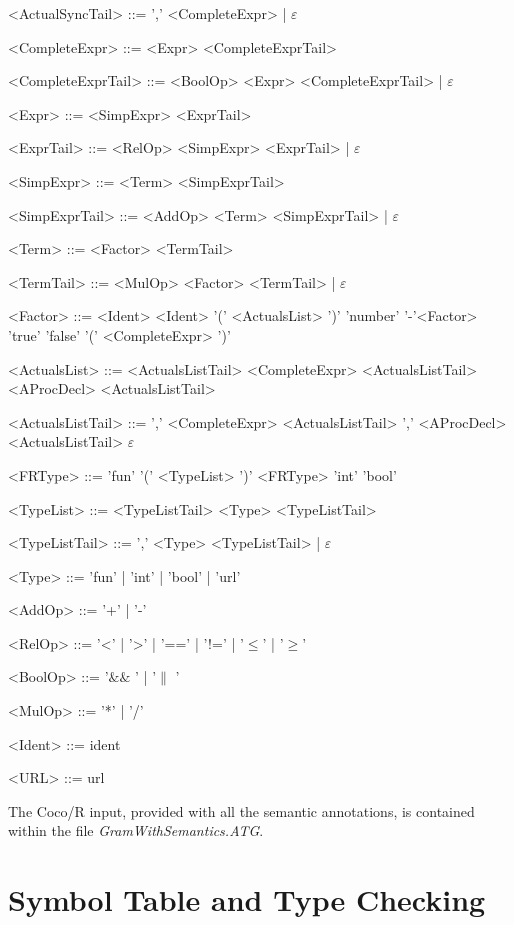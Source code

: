 \begin{grammar}
<ActualSyncTail> ::= ',' <CompleteExpr> | $\varepsilon$

<CompleteExpr> ::= <Expr> <CompleteExprTail> 

<CompleteExprTail> ::= <BoolOp> <Expr> <CompleteExprTail> | $\varepsilon$
		  
<Expr> ::= <SimpExpr> <ExprTail>

<ExprTail> ::=  <RelOp> <SimpExpr> <ExprTail> | $\varepsilon$
	  
<SimpExpr> ::= <Term> <SimpExprTail>

<SimpExprTail> ::=  <AddOp> <Term> <SimpExprTail> | $\varepsilon$

<Term> ::= <Factor> <TermTail>

<TermTail> ::= <MulOp> <Factor> <TermTail> | $\varepsilon$

<Factor> ::= 
		<Ident>
		\alt <Ident> '(' <ActualsList> ')' 
		\alt 'number' 
		\alt '-'<Factor> 	
		\alt 'true' 
		\alt 'false' 
		\alt '(' <CompleteExpr> ')'
		
<ActualsList> ::= 	<ActualsListTail> 
					 <ActualsListTail>
					\alt <AProcDecl> <ActualsListTail>

<ActualsListTail> ::= 	',' <CompleteExpr> <ActualsListTail>
						\alt ',' <AProcDecl> <ActualsListTail>
						\alt $\varepsilon$					
		
<FRType> ::= 'fun' '(' <TypeList> ')' <FRType>
			\alt 'int' 
			\alt 'bool'

<TypeList> ::= 	<TypeListTail> 
				\alt <Type> <TypeListTail>

<TypeListTail> ::= ',' <Type> <TypeListTail> | $\varepsilon$	
			
<Type> ::= 'fun' | 'int' | 'bool' | 'url'

<AddOp> ::= '+' | '-'
	  
<RelOp> ::= '<' | '>' | '==' | '!=' | '$\leq$' | '$\geq$'
		  
<BoolOp> ::= '$\& \&$ ' | '$\|$ '

<MulOp> ::= '*' | '/'

<Ident> ::= ident

<URL> ::= url	

\end{grammar}

The Coco/R input, provided with all the semantic annotations, is contained within the file \textit{GramWithSemantics.ATG}.

\section{Symbol Table and Type Checking}


